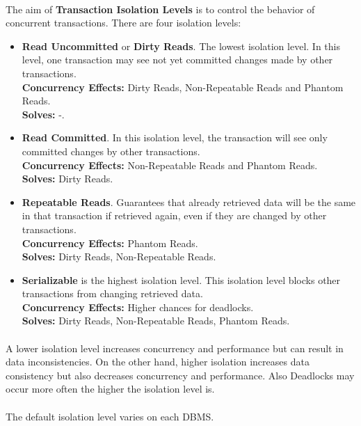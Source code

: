 \paragraph{} The aim of \textbf{Transaction Isolation Levels} is to control the behavior of concurrent transactions. There are four isolation levels:
\begin{itemize}
	\item \textbf{Read Uncommitted} or \textbf{Dirty Reads}. The lowest isolation level. In this level, one transaction may see not yet committed changes made by other transactions.\\\textbf{Concurrency Effects:} Dirty Reads, Non-Repeatable Reads and Phantom Reads.\\\textbf{Solves:} -.
	\item \textbf{Read Committed}. In this isolation level, the transaction will see only committed changes by other transactions.\\\textbf{Concurrency Effects:} Non-Repeatable Reads and Phantom Reads.\\\textbf{Solves:} Dirty Reads.
	\item \textbf{Repeatable Reads}. Guarantees that already retrieved data will be the same in that transaction if retrieved again, even if they are changed by other transactions.\\\textbf{Concurrency Effects:} Phantom Reads.\\\textbf{Solves:} Dirty Reads, Non-Repeatable Reads.
	\item \textbf{Serializable} is the highest isolation level. This isolation level blocks other transactions from changing retrieved data.\\\textbf{Concurrency Effects:} Higher chances for deadlocks.\\\textbf{Solves:} Dirty Reads, Non-Repeatable Reads, Phantom Reads.
\end{itemize}
\paragraph{} A lower isolation level increases concurrency and performance but can result in data inconsistencies. On the other hand, higher isolation increases data consistency but also decreases concurrency and performance. Also Deadlocks may occur more often the higher the isolation level is.
\paragraph{} The default isolation level varies on each \acs{DBMS}.
